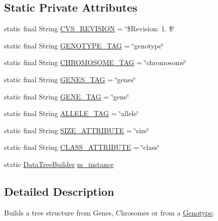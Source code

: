 \subsection*{Static Private Attributes}
\begin{DoxyCompactItemize}
\item 
static final String \hyperlink{classorg_1_1jgap_1_1data_1_1_data_tree_builder_a6a849e086eb4968ee222f54c88fde434}{C\-V\-S\-\_\-\-R\-E\-V\-I\-S\-I\-O\-N} = \char`\"{}\$Revision\-: 1. \$\char`\"{}
\item 
static final String \hyperlink{classorg_1_1jgap_1_1data_1_1_data_tree_builder_a5151f68709a72808128f5022345b6904}{G\-E\-N\-O\-T\-Y\-P\-E\-\_\-\-T\-A\-G} = \char`\"{}genotype\char`\"{}
\item 
static final String \hyperlink{classorg_1_1jgap_1_1data_1_1_data_tree_builder_a16cc969003639f011808aa7c7d390986}{C\-H\-R\-O\-M\-O\-S\-O\-M\-E\-\_\-\-T\-A\-G} = \char`\"{}chromosome\char`\"{}
\item 
static final String \hyperlink{classorg_1_1jgap_1_1data_1_1_data_tree_builder_a88f593d267eba709ce8ad8cf073d8a1c}{G\-E\-N\-E\-S\-\_\-\-T\-A\-G} = \char`\"{}genes\char`\"{}
\item 
static final String \hyperlink{classorg_1_1jgap_1_1data_1_1_data_tree_builder_abbe22f7d2754e88376cfd319b9ec71af}{G\-E\-N\-E\-\_\-\-T\-A\-G} = \char`\"{}gene\char`\"{}
\item 
static final String \hyperlink{classorg_1_1jgap_1_1data_1_1_data_tree_builder_a7148bfc7e73492da0cd1d5c1cbcc0fd2}{A\-L\-L\-E\-L\-E\-\_\-\-T\-A\-G} = \char`\"{}allele\char`\"{}
\item 
static final String \hyperlink{classorg_1_1jgap_1_1data_1_1_data_tree_builder_a70642e3964a539a1dc0b556449d47c7f}{S\-I\-Z\-E\-\_\-\-A\-T\-T\-R\-I\-B\-U\-T\-E} = \char`\"{}size\char`\"{}
\item 
static final String \hyperlink{classorg_1_1jgap_1_1data_1_1_data_tree_builder_a2bba03d3ed93657ca4c8ea500d1d3158}{C\-L\-A\-S\-S\-\_\-\-A\-T\-T\-R\-I\-B\-U\-T\-E} = \char`\"{}class\char`\"{}
\item 
static \hyperlink{classorg_1_1jgap_1_1data_1_1_data_tree_builder}{Data\-Tree\-Builder} \hyperlink{classorg_1_1jgap_1_1data_1_1_data_tree_builder_acce17f35d7c0744686b5b7c0758546ad}{m\-\_\-instance}
\end{DoxyCompactItemize}


\subsection{Detailed Description}
Builds a tree structure from Genes, Chrosomes or from a \hyperlink{classorg_1_1jgap_1_1_genotype}{Genotype}. 

